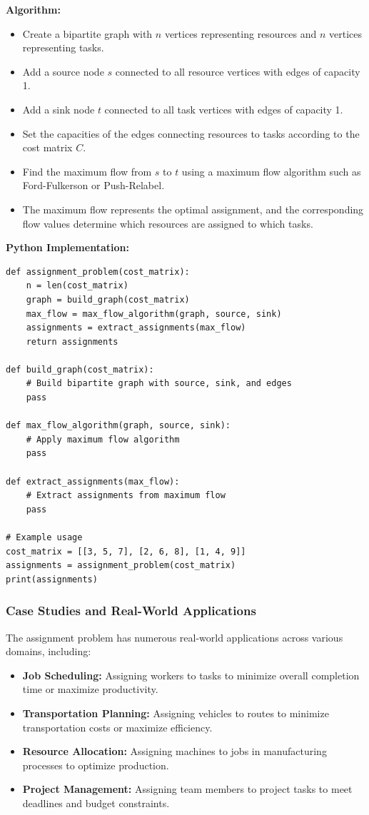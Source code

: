 \documentclass[12pt]{book} %
\begin{document}
\textbf{Algorithm:}
\begin{itemize}
    \item Create a bipartite graph with \(n\) vertices representing resources and \(n\) vertices representing tasks.
\item Add a source node \(s\) connected to all resource vertices with edges of capacity 1.
\item Add a sink node \(t\) connected to all task vertices with edges of capacity 1.
\item Set the capacities of the edges connecting resources to tasks according to the cost matrix \(C\).
\item Find the maximum flow from \(s\) to \(t\) using a maximum flow algorithm such as Ford-Fulkerson or Push-Relabel.
\item The maximum flow represents the optimal assignment, and the corresponding flow values determine which resources are assigned to which tasks.
\end{itemize}

\textbf{Python Implementation:}
\FloatBarrier
\begin{lstlisting}
def assignment_problem(cost_matrix):
    n = len(cost_matrix)
    graph = build_graph(cost_matrix)
    max_flow = max_flow_algorithm(graph, source, sink)
    assignments = extract_assignments(max_flow)
    return assignments

def build_graph(cost_matrix):
    # Build bipartite graph with source, sink, and edges
    pass

def max_flow_algorithm(graph, source, sink):
    # Apply maximum flow algorithm
    pass

def extract_assignments(max_flow):
    # Extract assignments from maximum flow
    pass

# Example usage
cost_matrix = [[3, 5, 7], [2, 6, 8], [1, 4, 9]]
assignments = assignment_problem(cost_matrix)
print(assignments)
\end{lstlisting}

\FloatBarrier
\subsubsection{Case Studies and Real-World Applications}

The assignment problem has numerous real-world applications across various domains, including:
\begin{itemize}
    \item  \textbf{Job Scheduling:} Assigning workers to tasks to minimize overall completion time or maximize productivity.
\item \textbf{Transportation Planning:} Assigning vehicles to routes to minimize transportation costs or maximize efficiency.
\item \textbf{Resource Allocation:} Assigning machines to jobs in manufacturing processes to optimize production.
\item \textbf{Project Management:} Assigning team members to project tasks to meet deadlines and budget constraints.
\end{itemize}
\end{document}
